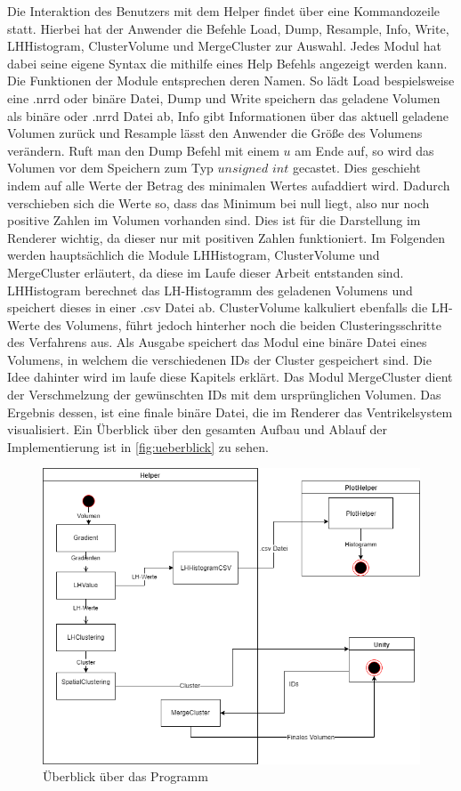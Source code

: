 Die Interaktion des Benutzers mit dem Helper findet über eine Kommandozeile statt. Hierbei hat der Anwender die Befehle Load, Dump, Resample, Info, Write, LHHistogram, ClusterVolume und MergeCluster zur Auswahl. Jedes Modul hat dabei seine eigene Syntax die mithilfe eines Help Befehls angezeigt werden kann.
\newline
Die Funktionen der Module entsprechen deren Namen. So lädt Load bespielsweise eine .nrrd oder binäre Datei, Dump und Write speichern das geladene Volumen als binäre oder .nrrd Datei ab, Info gibt Informationen über das aktuell geladene Volumen zurück und Resample lässt den Anwender die Größe des Volumens verändern. Ruft man den Dump Befehl mit einem $u$ am Ende auf, so wird das Volumen vor dem Speichern zum Typ $unsigned$ $int$ gecastet. Dies geschieht indem auf alle Werte der Betrag des minimalen Wertes aufaddiert wird. Dadurch verschieben sich die Werte so, dass das Minimum bei null liegt, also nur noch positive Zahlen im Volumen vorhanden sind. Dies ist für die Darstellung im Renderer wichtig, da dieser nur mit positiven Zahlen funktioniert.
\newline
Im Folgenden werden hauptsächlich die Module LHHistogram, ClusterVolume und MergeCluster erläutert, da diese im Laufe dieser Arbeit entstanden sind. LHHistogram berechnet das LH-Histogramm des geladenen Volumens und speichert dieses in einer .csv Datei ab. ClusterVolume kalkuliert ebenfalls die LH-Werte des Volumens, führt jedoch hinterher noch die beiden Clusteringsschritte des Verfahrens aus. Als Ausgabe speichert das Modul eine binäre Datei eines Volumens, in welchem die verschiedenen IDs der Cluster gespeichert sind. Die Idee dahinter wird im laufe diese Kapitels erklärt. Das Modul MergeCluster dient der Verschmelzung der gewünschten IDs mit dem ursprünglichen Volumen. Das Ergebnis dessen, ist eine finale binäre Datei, die im Renderer das Ventrikelsystem visualisiert. Ein Überblick über den gesamten Aufbau und Ablauf der Implementierung ist in  \autoref{fig:ueberblick} zu sehen.

\begin{figure}
\centering 
\includegraphics[width=\textwidth]{Logos/Ueberblick.png}
\caption{Überblick über das Programm} 
\label{fig:ueberblick} 
\end{figure}


